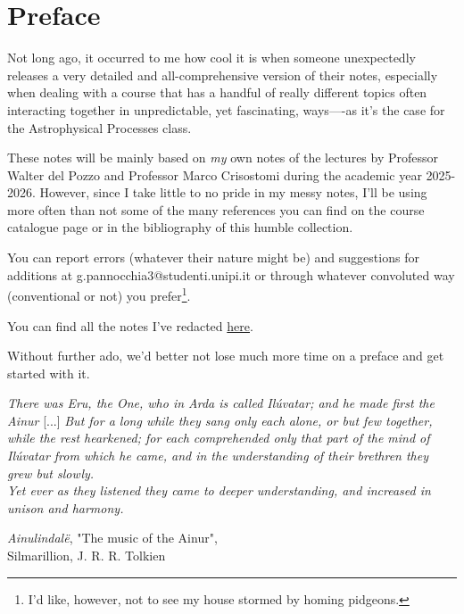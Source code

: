 \chapter*{Preface}

Not long ago, it occurred to me how cool it is when someone unexpectedly releases a very detailed and all-comprehensive version of their notes, especially when dealing with a course that has a handful of really different topics often interacting together in unpredictable, yet fascinating, ways----as it's the case for the Astrophysical Processes class.
\par These notes will be mainly based on \emph{my} own notes of the lectures by Professor Walter del Pozzo and Professor Marco Crisostomi during the academic year 2025-2026. However, since I take little to no pride in my messy notes, I'll be using more often than not some of the many references you can find on the course catalogue page or in the bibliography of this humble collection.
\par You can report errors (whatever their nature might be) and suggestions for additions at g.pannocchia3@studenti.unipi.it or through whatever convoluted way (conventional or not) you prefer\footnote{I'd like, however, not to see my house stormed by homing pidgeons.}.
\par You can find all the notes I've redacted \href{https://github.com/gpannocchia3}{here}.
\par Without further ado, we'd better not lose much more time on a preface and get started with it.
\begin{center}
    \emph{There was Eru, the One, who in Arda is called Ilúvatar; and he made first the Ainur} [...] \emph{But for a long while they sang only each alone, or but few together, while the rest hearkened; for each comprehended only that part of the mind of Ilúvatar from which he came, and in the understanding of their brethren they grew but slowly. \\ \vspace{3pt}
    Yet ever as they listened they came to deeper understanding, and increased in unison and harmony.}
\end{center}
\begin{flushright}
    \emph{Ainulindalë}, "The music of the Ainur",\\
    Silmarillion, J. R. R. Tolkien
\end{flushright}